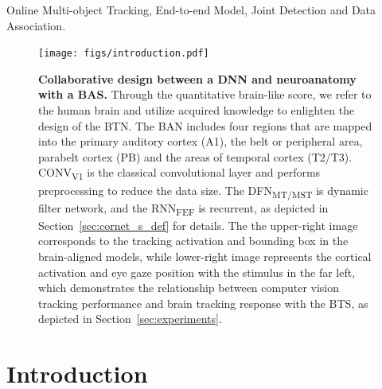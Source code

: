 \documentclass[journal]{IEEEtran}
\begin{document}
\begin{IEEEkeywords} 
Online Multi-object Tracking, End-to-end Model, Joint Detection and Data Association. 
\end{IEEEkeywords}


%
\IEEEpeerreviewmaketitle



\begin{figure}
	\centering
	\texttt{[image: figs/introduction.pdf]}
	\caption{
		\textbf{
		Collaborative design between a DNN and neuroanatomy with a BAS.} 
		Through the quantitative brain-like score, we refer to the human brain and utilize acquired knowledge to enlighten the design of the BTN. 
		The BAN includes four regions that are mapped into the primary auditory cortex (A1), 		the belt or peripheral area, parabelt cortex (PB) and the areas of temporal cortex (T2/T3). 
		CONV\textsubscript{V1} is the classical convolutional layer and performs preprocessing to reduce the data size.
		The DFN\textsubscript{MT/MST} is dynamic filter network, and the RNN\textsubscript{FEF} is recurrent, as depicted in Section~\ref{sec:cornet_s_def} for details.
		The the upper-right image corresponds to the tracking activation and bounding box in the brain-aligned models, 
		while lower-right image represents the cortical activation and eye gaze position with the stimulus in the far left,
		which demonstrates the relationship between computer vision tracking performance and brain tracking response with the BTS, as depicted in Section~\ref{sec:experiments}.
	}
	\label{fig:introduction}
\end{figure}


\section{Introduction}
% 
% 
% 
% 
\end{document}
